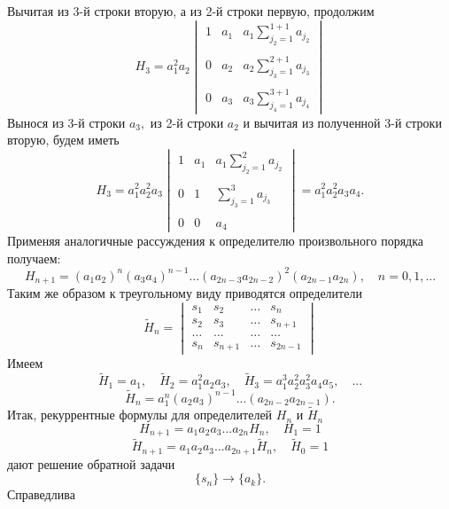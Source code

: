 \documentclass[12pt,a4paper]{article}
\theoremstyle{plain}   \newtheorem{Pro}{Задача}
\begin{document}
Вычитая из 3-й строки вторую, а из 2-й строки первую, продолжим
\begin{equation*}
  H_3 =a_1 ^2 a_2
    \begin{vmatrix}
	  1 & a_1 & a_1 \sum _{j_2 =1}^{1+1}a_{j_2} \\
	  \; & \; & \; \\
	  0 & a_2 & a_2 \sum _{j_3 =1}^{2+1}a_{j_3} \\
	  \; & \; & \; \\
	  0 & a_3 & a_3 \sum _{j_4 =1}^{3+1}a_{j_4}
	\end{vmatrix}
\end{equation*}
Вынося из 3-й строки
$ a_3 , $
из 2-й строки
$ a_2 $
и вычитая из полученной 3-й строки вторую, будем иметь
\begin{equation*}
  H_3 =a_1 ^2 a_2 ^2 a_3
    \begin{vmatrix}
	  1 & a_1 & a_1 \sum _{j_2 =1}^2 a_{j_2} \\
	  \; & \; & \; \\
	  0 & 1 & \sum _{j_3 =1}^3 a_{j_3} \\
	  \; & \; & \; \\
	  0 & 0 & a_4
	\end{vmatrix}
	= a_1 ^2 a_2 ^2 a_3 a_4 .
\end{equation*}
Применяя аналогичные рассуждения к определителю произвольного
порядка получаем:
$$
  H_{n+1}=(a_1 a_2 )^n (a_3 a_4 )^{n-1}...
    (a_{2n-3}a_{2n-2})^2 (a_{2n-1}a_{2n}),
	  \quad n=0,1,...
$$
Таким же образом к треугольному виду приводятся определители
\begin{equation*}
  \tilde H_n =
    \begin{vmatrix}
	  s_1 & s_2 & \dots & s_n \\
	  s_2 & s_3 & \dots & s_{n+1} \\
	  \dots & \dots & \dots & \dots \\
	  s_n & s_{n+1} & \dots & s_{2n-1}
	\end{vmatrix}
\end{equation*}
Имеем
$$
  \tilde H_1 =a_1 , \quad
    \tilde H_2 = a_1 ^2 a_2 a_3 , \quad
	  \tilde H_3 = a_1 ^3 a_2 ^2 a_3 ^2 a_4 a_5 ,\quad ...
$$
$$
  \tilde H_n = a_1 ^n (a_2 a_3 )^{n-1}...(a_{2n-2}a_{2n-1}).
$$
Итак, рекуррентные формулы для определителей
$ H_n $
и
$ \tilde H_n $
$$
  H_{n+1}=a_1 a_2 a_3 ...a_{2n} H_n ,
    \quad H_1 =1
$$
$$
  \tilde H_{n+1}=a_1 a_2 a_3 ...a_{2n+1} \tilde H_n ,
    \quad \tilde H_0 =1
$$
дают решение обратной задачи
$$
  \{ s_n \} \longrightarrow \{ a_k \} .
$$
Справедлива
\end{document}
